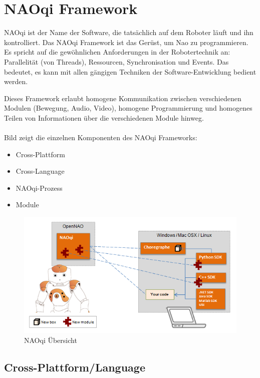 \section{NAOqi Framework}

NAOqi ist der Name der Software, die tatsächlich auf dem Roboter läuft und ihn kontrolliert. Das NAOqi Framework ist das Gerüst, um Nao zu programmieren. Es spricht auf die gewöhnlichen Anforderungen in der Robotertechnik an: Parallelität (von Threads), Ressourcen, Synchronisation und Events. Das bedeutet, es kann mit allen gängigen Techniken der Software-Entwicklung bedient werden. 

Dieses Framework erlaubt homogene Kommunikation zwischen verschiedenen Modulen (Bewegung, Audio, Video), homogene Programmierung und homogenes Teilen von Informationen über die verschiedenen Module hinweg.
\\
\\
\noindent
Bild  zeigt die einzelnen Komponenten des NAOqi Frameworks:
\begin{itemize}
\item Cross-Plattform
\item Cross-Language
\item NAOqi-Prozess
\item Module
\end{itemize}

\begin{figure}[H]						
	\centering							
	\includegraphics[scale=0.8]{Bilder/naoqi_ov.PNG}
	\caption{NAOqi Übersicht}						
	\label{f:naoqi_ov}						
\end{figure}


\subsection{Cross-Plattform/Language}

